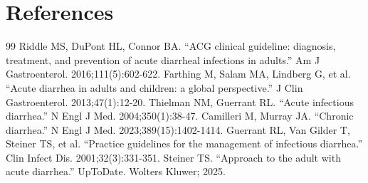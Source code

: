 \section*{References}
\begin{thebibliography}{99}
 Riddle MS, DuPont HL, Connor BA. ``ACG clinical guideline: diagnosis, treatment, and prevention of acute diarrheal infections in adults.'' Am J Gastroenterol. 2016;111(5):602-622.
 Farthing M, Salam MA, Lindberg G, et al. ``Acute diarrhea in adults and children: a global perspective.'' J Clin Gastroenterol. 2013;47(1):12-20.
 Thielman NM, Guerrant RL. ``Acute infectious diarrhea.'' N Engl J Med. 2004;350(1):38-47.
 Camilleri M, Murray JA. ``Chronic diarrhea.'' N Engl J Med. 2023;389(15):1402-1414.
 Guerrant RL, Van Gilder T, Steiner TS, et al. ``Practice guidelines for the management of infectious diarrhea.'' Clin Infect Dis. 2001;32(3):331-351.
 Steiner TS. ``Approach to the adult with acute diarrhea.'' UpToDate. Wolters Kluwer; 2025.
\end{thebibliography}
